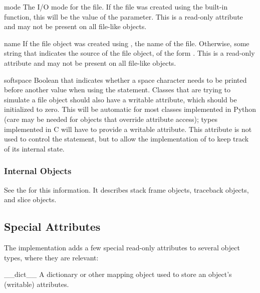 \begin{memberdesc}[file]{mode}
The I/O mode for the file.  If the file was created using the
 built-in function, this will be the value of the
 parameter.  This is a read-only attribute and may not be
present on all file-like objects.
\end{memberdesc}

\begin{memberdesc}[file]{name}
If the file object was created using , the name of
the file.  Otherwise, some string that indicates the source of the
file object, of the form \samp{<\mbox{\ldots}>}.  This is a read-only
attribute and may not be present on all file-like objects.
\end{memberdesc}

\begin{memberdesc}[file]{softspace}
Boolean that indicates whether a space character needs to be printed
before another value when using the  statement.
Classes that are trying to simulate a file object should also have a
writable  attribute, which should be initialized to
zero.  This will be automatic for most classes implemented in Python
(care may be needed for objects that override attribute access); types
implemented in C will have to provide a writable
 attribute.
  This attribute is not used to control the
 statement, but to allow the implementation of
 to keep track of its internal state.
\end{memberdesc}


\subsubsection{Internal Objects \label{typesinternal}}

See the  for this
information.  It describes stack frame objects, traceback objects, and
slice objects.


\subsection{Special Attributes \label{specialattrs}}

The implementation adds a few special read-only attributes to several
object types, where they are relevant:

\begin{memberdesc}[object]{__dict__}
A dictionary or other mapping object used to store an
object's (writable) attributes.
\end{memberdesc}

